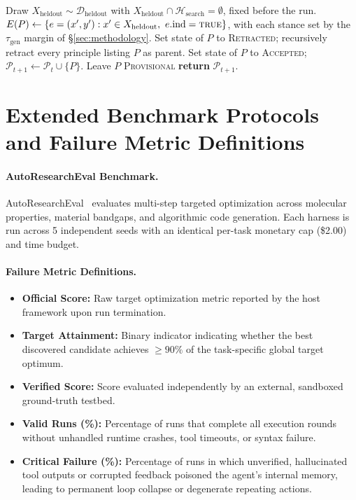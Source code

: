 \documentclass{article}
\begin{document}
\begin{algorithm}[!ht]
\begin{algorithmic}[1]
    \STATE {}
    \STATE Draw $X_{\mathrm{heldout}} \sim \mathcal{D}_{\mathrm{heldout}}$ with $X_{\mathrm{heldout}} \cap \mathcal{H}_{\mathrm{search}} = \emptyset$, fixed before the run.
    \STATE $E(P) \leftarrow \{e = (x',y') : x' \in X_{\mathrm{heldout}},\ e.\mathrm{ind} = \textsc{true}\}$, with each stance set by the $\tau_{\mathrm{gen}}$ margin of §\ref{sec:methodology}.
        \STATE Set state of $P$ to \textsc{Retracted}; recursively retract every principle listing $P$ as parent.
        \STATE Set state of $P$ to \textsc{Accepted}; $\mathcal{P}_{t+1} \leftarrow \mathcal{P}_t \cup \{P\}$.
    \ELSE
        \STATE Leave $P$ \textsc{Provisional} 
    \ENDIF
\ENDIF
\STATE \textbf{return} $\mathcal{P}_{t+1}$.
\end{algorithmic}
\end{algorithm}

\section{Extended Benchmark Protocols and Failure Metric Definitions}
\label{app:protocol}

\paragraph{AutoResearchEval Benchmark.} AutoResearchEval~\citep{fei2026autoresearcheval} evaluates multi-step targeted optimization across molecular properties, material bandgaps, and algorithmic code generation. Each harness is run across 5 independent seeds with an identical per-task monetary cap (\$2.00) and time budget.
\paragraph{Failure Metric Definitions.}
\begin{itemize}[nosep, leftmargin=12pt]
  \item \textbf{Official Score:} Raw target optimization metric reported by the host framework upon run termination.
  \item \textbf{Target Attainment:} Binary indicator indicating whether the best discovered candidate achieves $\ge 90\%$ of the task-specific global target optimum.
  \item \textbf{Verified Score:} Score evaluated independently by an external, sandboxed ground-truth testbed.
  \item \textbf{Valid Runs (\%):} Percentage of runs that complete all execution rounds without unhandled runtime crashes, tool timeouts, or syntax failure.
  \item \textbf{Critical Failure (\%):} Percentage of runs in which unverified, hallucinated tool outputs or corrupted feedback poisoned the agent's internal memory, leading to permanent loop collapse or degenerate repeating actions.
\end{itemize}
\end{document}
